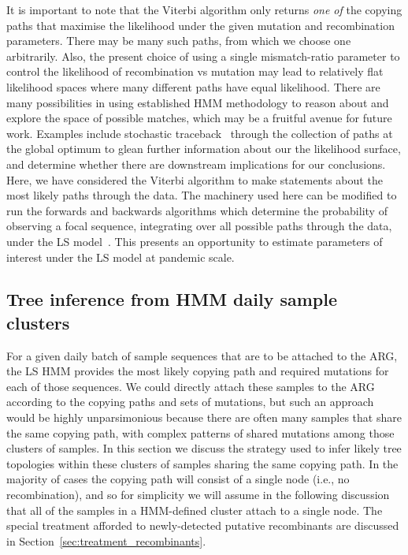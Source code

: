 \documentclass{article}
\begin{document}
It is important to note that the Viterbi algorithm only returns \emph{one of}
the copying paths that maximise the likelihood under the given mutation and
recombination parameters. There may be many such paths, from which we choose
one arbitrarily. Also, the present choice of using a single mismatch-ratio
parameter to control the likelihood of recombination vs mutation may lead to
relatively flat likelihood spaces where many different paths have equal
likelihood.
There are many possibilities in using established HMM methodology
to reason about and explore the space of possible matches, which may be a
fruitful avenue for future work.
Examples include stochastic traceback~\citep[e.g.,][]{rasmussen2014genome}
through the collection of paths at the global optimum to glean further
information about our the likelihood surface, and determine whether there are
downstream implications for our conclusions. Here, we have considered the
Viterbi algorithm to make statements about the most likely paths through the
data. The machinery used here can be modified to run the forwards and backwards
algorithms which determine the probability of observing a focal sequence,
integrating over all possible paths through the data, under the LS
model~\citep{Palmer2023-efficient}.
This presents an opportunity to estimate parameters of interest
under the LS model at pandemic scale.

\subsection{Tree inference from HMM daily sample clusters}
\label{sec:sample-cluster-tree-inference}
For a given daily batch of sample sequences that are to be attached to the
ARG, the LS HMM provides the most likely copying path and required mutations
for each of those sequences. We could directly attach these samples to
the ARG according to the copying paths and sets of mutations, but
such an approach would be highly unparsimonious because there are
often many samples that share the same copying path, with
complex patterns of shared mutations among those clusters of samples.
In this section we discuss the strategy used to infer likely tree
topologies within these clusters of samples sharing the same copying path.
In the majority of cases the copying path will consist of a single
node (i.e., no recombination), and so for simplicity we will assume in the
following discussion that all of the samples in a HMM-defined cluster
attach to a single node. The special treatment afforded to
newly-detected putative recombinants are discussed
in Section~\ref{sec:treatment_recombinants}.
\end{document}
